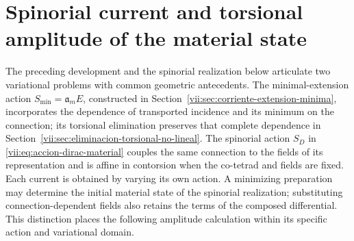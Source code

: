 
\section{Spinorial current and torsional amplitude of the material state}
\label{vii:sec:corriente-espinorial-densidad}

The preceding development and the spinorial realization below articulate
two variational problems with common geometric antecedents. The
minimal-extension action \(S_{\min}=\mathfrak a_m E\), constructed in
Section~\ref{vii:sec:corriente-extension-minima}, incorporates the
dependence of transported incidence and its minimum on the
connection; its torsional elimination preserves that complete dependence in
Section~\ref{vii:sec:eliminacion-torsional-no-lineal}. The spinorial
action \(S_D\) in \eqref{vii:eq:accion-dirac-material} couples the
same connection to the fields of its representation and is affine in
contorsion when the co-tetrad and fields are fixed. Each current is obtained
by varying its own action. A minimizing preparation may determine
the initial material state of the spinorial realization; substituting
connection-dependent fields also retains the terms of the
composed differential. This distinction places the following amplitude
calculation within its specific action and variational domain.

